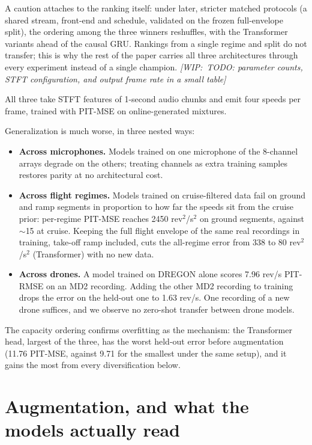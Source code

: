 \documentclass[journal]{IEEEtran}
\newcommand{\wip}[1]{{\color{gray!70!black}\textit{[WIP:~#1]}}}
\begin{document}
A caution attaches to the ranking itself: under later, stricter matched
protocols (a shared stream, front-end and schedule, validated on the frozen
full-envelope split), the ordering among the three winners reshuffles, with
the Transformer variants ahead of the causal GRU. Rankings from a single
regime and split do not transfer; this is why the rest of the paper carries
all three architectures through every experiment instead of a single
champion. \wip{TODO: parameter counts, STFT configuration, and output frame
rate in a small table}

All three take STFT features of 1-second audio chunks and emit four speeds
per frame, trained with PIT-MSE on online-generated mixtures.

Generalization is much worse, in three nested ways:

\begin{itemize}
\item \textbf{Across microphones.} Models trained on one microphone of the
  8-channel arrays degrade on the others; treating channels as extra training
  samples restores parity at no architectural cost.
\item \textbf{Across flight regimes.} Models trained on cruise-filtered data
  fail on ground and ramp segments in proportion to how far the speeds sit
  from the cruise prior: per-regime PIT-MSE reaches 2450 rev$^2$/s$^2$ on
  ground segments, against $\sim$15 at cruise. Keeping the full flight
  envelope of the same real recordings in training, take-off ramp included,
  cuts the all-regime error from 338 to 80 rev$^2$/s$^2$ (Transformer) with
  no new data.
\item \textbf{Across drones.} A model trained on DREGON alone scores 7.96
  rev/s PIT-RMSE on an MD2 recording. Adding the other MD2 recording to
  training drops the error on the held-out one to 1.63 rev/s. One recording
  of a new drone suffices, and we observe no zero-shot transfer between drone
  models.
\end{itemize}

The capacity ordering confirms overfitting as the mechanism: the Transformer
head, largest of the three, has the worst held-out error before augmentation
(11.76 PIT-MSE, against 9.71 for the smallest under the same setup), and it
gains the most from every diversification below.

\section{Augmentation, and what the models actually read}
\label{sec:augmentation}
\end{document}
